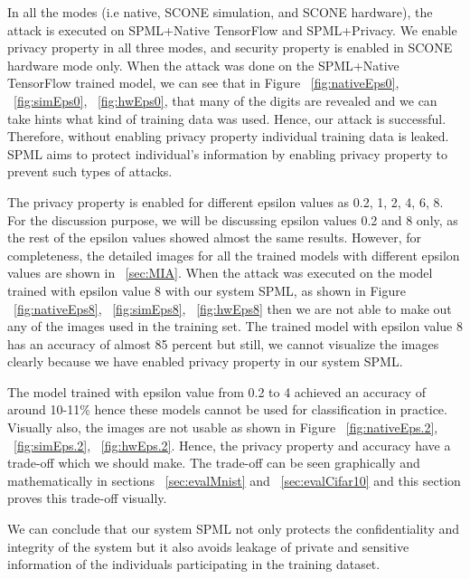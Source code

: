 In all the modes (i.e native, SCONE simulation, and SCONE hardware), the attack is executed on SPML+Native TensorFlow and SPML+Privacy. We enable privacy property in all three modes, and security property is enabled in SCONE hardware mode only. When the attack was done on the SPML+Native TensorFlow trained model, we can see that in Figure ~\ref{fig:nativeEps0}, ~\ref{fig:simEps0}, ~\ref{fig:hwEps0}, that many of the digits are revealed and we can take hints what kind of training data was used. Hence, our attack is successful. Therefore, without enabling privacy property individual training data is leaked. SPML aims to protect individual's information by enabling privacy property to prevent such types of attacks.

The privacy property is enabled for different epsilon values as 0.2, 1, 2, 4, 6, 8. For the discussion purpose, we will be discussing epsilon values 0.2 and 8 only, as the rest of the epsilon values showed almost the same results. However, for completeness, the detailed images for all the trained models with different epsilon values are shown in ~\ref{sec:MIA}. When the attack was executed on the model trained with epsilon value 8 with our system SPML, as shown in Figure ~\ref{fig:nativeEps8}, ~\ref{fig:simEps8}, ~\ref{fig:hwEps8} then we are not able to make out any of the images used in the training set.  The trained model with epsilon value 8 has an accuracy of almost 85 percent but still, we cannot visualize the images clearly because we have enabled privacy property in our system SPML.

The model trained with epsilon value from 0.2 to 4 achieved an accuracy of around 10-11\% hence these models cannot be used for classification in practice. Visually also, the images are not usable as shown in Figure ~\ref{fig:nativeEps.2}, ~\ref{fig:simEps.2}, ~\ref{fig:hwEps.2}. Hence, the privacy property and accuracy have a trade-off which we should make. The trade-off can be seen graphically and mathematically in sections ~\ref{sec:evalMnist} and ~\ref{sec:evalCifar10} and this section proves this trade-off visually. 

We can conclude that our system SPML not only protects the confidentiality and integrity of the system but it also avoids leakage of private and sensitive information of the individuals participating in the training dataset. 

